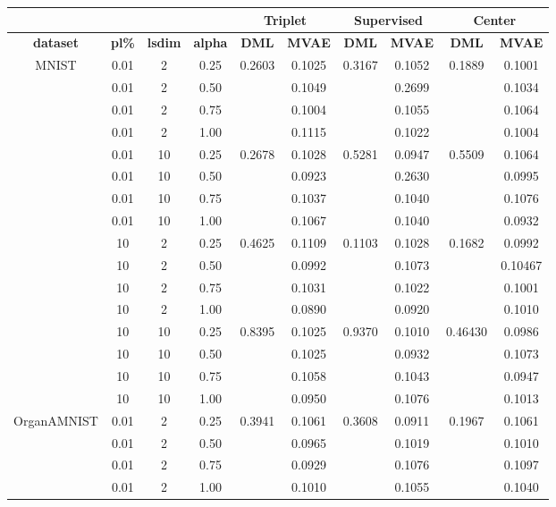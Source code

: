 \documentclass[./dissertation.tex]{subfiles}
\begin{document}
    \begin{table}
    \begin{tabular}{|c|c|c|c|c|c|c|c|c|c|}
            \hline
            & & & &  \multicolumn{2}{|c|}{\textbf{Triplet}} & \multicolumn{2}{|c|}{\textbf{Supervised}} & \multicolumn{2}{|c|}{\textbf{Center}}\\
            \hline
            \textbf{dataset} & \textbf{pl\%} & \textbf{lsdim} & \textbf{alpha} & \textbf{DML} & \textbf{MVAE} & \textbf{DML} & \textbf{MVAE} &
            \textbf{DML} &
            \textbf{MVAE}\\
            \hline
            MNIST & 0.01 & 2 & 0.25 & 0.2603 & 0.1025 & 0.3167 & 0.1052 & 0.1889 & 0.1001 \\
             & 0.01 & 2 & 0.50 & & 0.1049 & & 0.2699 & & 0.1034 \\
             & 0.01 & 2 & 0.75 & & 0.1004 & & 0.1055 & & 0.1064 \\
             & 0.01 & 2 & 1.00 & & 0.1115 & & 0.1022 & & 0.1004 \\
             & 0.01 & 10 & 0.25 & 0.2678 & 0.1028 & 0.5281 & 0.0947 & 0.5509  & 0.1064 \\
             & 0.01 & 10 & 0.50 & & 0.0923 & & 0.2630 & & 0.0995 \\
             & 0.01 & 10 & 0.75 & & 0.1037 & & 0.1040 & & 0.1076 \\
             & 0.01 & 10 & 1.00 & & 0.1067 & & 0.1040 & & 0.0932 \\
             & 10 & 2 & 0.25 & 0.4625 & 0.1109 & 0.1103 & 0.1028 & 0.1682 & 0.0992 \\
             & 10 & 2 & 0.50 & & 0.0992 & & 0.1073  & & 0.10467 \\
             & 10 & 2 & 0.75 & & 0.1031 & & 0.1022 & & 0.1001 \\
             & 10 & 2 & 1.00 & & 0.0890 & & 0.0920 & & 0.1010 \\
             & 10 & 10 & 0.25 & 0.8395 & 0.1025 & 0.9370 & 0.1010 & 0.46430 & 0.0986 \\
             & 10 & 10 & 0.50 & & 0.1025 & & 0.0932 & & 0.1073 \\
             & 10 & 10 & 0.75 & & 0.1058 & & 0.1043 & & 0.0947 \\
             & 10 & 10 & 1.00 & & 0.0950 & & 0.1076 & & 0.1013 \\
             
             OrganAMNIST & 0.01 & 2 & 0.25 & 0.3941 & 0.1061 & 0.3608 & 0.0911 & 0.1967 & 0.1061\\
             & 0.01 & 2 & 0.50 & & 0.0965 & & 0.1019 & & 0.1010  \\
             & 0.01 & 2 & 0.75 & & 0.0929 & & 0.1076 & & 0.1097\\
             & 0.01 & 2 & 1.00 & & 0.1010 & & 0.1055 & & 0.1040 \\
             

\end{tabular}
\end{table}
\end{document}
